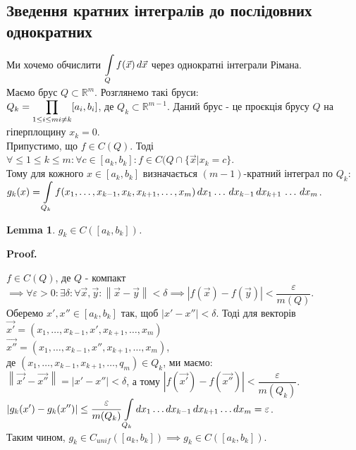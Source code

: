 \documentclass[a4paper, 10pt]{article}
\makeatletter
\def\qed{$\blacksquare$}
\theoremstyle{theoremdd}
\theoremstyle{theoremdd}
\theoremstyle{theoremdd}
\theoremstyle{theoremdd}
\theoremstyle{theoremdd}
\theoremstyle{theoremdd}
\theoremstyle{theoremdd}
\newtheorem{lemma}[theorem]{Lemma}
\theoremstyle{theoremdd}
\renewenvironment{proof}[1][Proof.\\]{\par
\pushQED{\hfill \qed}%
\normalfont \topsep6\p@\@plus6\p@\relax
\trivlist
\item\relax
{\bfseries
#1\@addpunct{.}}\hspace\labelsep\ignorespaces
}{%
\popQED\endtrivlist\@endpefalse
}
\newcommand\Norm[1]{\left\lVert#1\right\rVert}
\makeatother
\begin{document}
\subsection{Зведення кратних інтегралів до послідовних однократних}
Ми хочемо обчислити $\displaystyle\int\displaylimits_Q f(\vec{x})\,d\vec{x}$ через однократні інтеграли Рімана.\\
Маємо брус $Q \subset \mathbb{R}^m$. Розглянемо такі бруси:\\
$Q_k = \displaystyle\prod_{\substack{}1 \leq i \leq m \\ i \neq k} [a_i,b_i]$, де $Q_k \subset \mathbb{R}^{m-1}$. Даний брус - це проєкція брусу $Q$ на гіперплощину $x_k = 0$.\\
Припустимо, що $f \in C(Q)$. Тоді $\forall \leq 1 \leq k \leq m: \forall c \in [a_k,b_k]: f \in C(Q \cap \{ \vec{x} | x_k = c \}$.\\
Тому для кожного $x \in [a_k,b_k]$ визначається $(m-1)$-кратний інтеграл по $Q_k$:\\
$g_k(x) = \displaystyle\int\displaylimits_{Q_k}f(x_1,\dots,x_{k-1},x_k,x_{k+1},\dots,x_m)\,dx_1\dots \,dx_{k-1}\,dx_{k+1}\,\dots\,dx_m$.

\begin{lemma}
$g_k \in C([a_k,b_k])$.
\end{lemma}

\begin{proof}
$f \in C(Q)$, де $Q$ - компакт $\implies \forall \varepsilon > 0: \exists \delta: \forall \vec{x}, \vec{y}: \Norm{\vec{x} - \vec{y}} < \delta \implies |f(\vec{x}) - f(\vec{y})| < \dfrac{\varepsilon}{m(Q)}$.\\
Оберемо $x',x'' \in [a_k,b_k]$ так, щоб $|x'-x''|<\delta$. Тоді для векторів\\
$\vec{x'} = (x_1,\dots,x_{k-1},x',x_{k+1},\dots,x_m)$\\
$\vec{x''} = (x_1,\dots,x_{k-1},x'',x_{k+1},\dots,x_m)$,\\
де $(x_1,\dots,x_{k-1},x_{k+1},\dots,q_m) \in Q_k$, ми маємо:\\
$\Norm{\vec{x'} - \vec{x''}} = |x'-x''| < \delta$, а тому $|f(\vec{x'}) - f(\vec{x''})| < \dfrac{\varepsilon}{m(Q_k)}$.\\
$\displaystyle |g_k(x') - g_k(x'')| \leq \dfrac{\varepsilon}{m(Q_k)} \int\displaylimits_{Q_k} dx_1\dots dx_{k-1}\,dx_{k+1}\dots dx_m = \varepsilon$.\\
Таким чином, $g_k \in C_{unif}([a_k,b_k]) \implies g_k \in C([a_k,b_k])$.
\end{proof}
\end{document}
